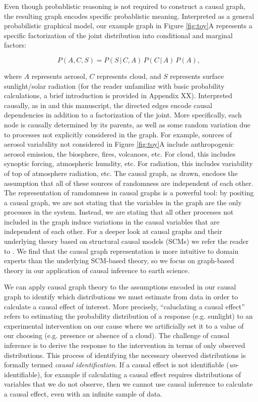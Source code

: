 \documentclass[12pt]{article}
\begin{document}
Even though probablistic reasoning is not required to construct a
causal graph, the resulting graph encodes specific probablistic
meaning. Interpreted as a general probabilistic graphical model, our
example graph in Figure \ref{fig:toy}A represents a specific
factorization of the joint distribution into conditional and marginal
factors:

\begin{equation}
  P(A, C, S) = P(S \, | \,C, A) \, P(C \, | \, A) \, P(A),
\end{equation}

where $A$ represents aerosol, $C$ represents cloud, and $S$ represents
surface sunlight/solar radiation (for the reader unfamiliar with basic
probability calculations, a brief introduction is provided in Appendix
XX). Interpreted causally, as in \citet{pearl1995causal} and this
manuscript, the directed edges encode causal dependencies in addition
to a factorization of the joint. More specifically, each node is
causally determined by its parents, as well as some random variation
due to processes not explicitly considered in the graph. For example,
sources of aerosol variability not considered in Figure \ref{fig:toy}A
include anthropogenic aerosol emission, the biosphere, fires,
volcanoes, etc. For cloud, this includes synoptic forcing, atmospheric
humdity, etc. For radiation, this includes variability of top of
atmosphere radiation, etc. The causal graph, as drawn, encdoes the
assumption that all of these sources of randomness are independent of
each other. The representation of ramdomness in causal graphs is a
powerful tool: by positing a causal graph, we are not stating that the
variables in the graph are the only processes in the system. Instead,
we are stating that all other processes not included in the graph
induce variations in the causal variables that are independent of each
other. For a deeper look at causal graphs and their underlying theory
based on structural causal models (SCMs) we refer the reader to
\citet{pearl2009}. We find that the causal graph representation is
more intuitive to domain experts than the underlying SCM-based theory,
so we focus on graph-based theory in our application of causal
inference to earth science.

We can apply causal graph theory
\citep[e.g.,][]{pearl1995causal,shpitser2006} to the assumptions
encoded in our causal graph to identify which distributions we must
estimate from data in order to calculate a causal effect of
interest. More precisely, ``caluclating a causal effect'' refers to
estimating the probability distribution of a response (e.g. sunlight)
to an experimental intervention on our cause where we artificially set
it to a value of our choosing (e.g. presence or absence of a
cloud). The challenge of causal inference is to derive the response to
the intervention in terms of only observed distributions. This process
of identifying the necessary observed distributions is formally termed
\emph{causal identification}. If a causal effect is not identifiable
(\emph{un}-identifiable), for example if calculating a causal effect
requires distributions of variables that we do not observe, then we
cannot use causal inference to calculate a causal effect, even with an
infinite sample of data.
\end{document}
